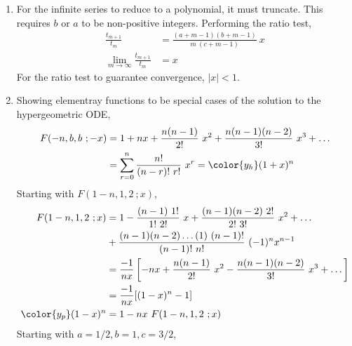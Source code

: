 \begin{enumerate}
\begin{enumerate}
              \item For the infinite series to reduce to a polynomial, it must truncate.
                    This requires $ b $ or $ a $ to be non-positive integers.
                    Performing the ratio test,
                    \begin{align}
                        \frac{t_{m+1}}{t_m}                             &
                        = \frac{(a+m-1)(b+m-1)}{m\ (c+m-1)}\ x                \\
                        \lim_{m \rightarrow \infty} \frac{t_{m+1}}{t_m} & = x
                    \end{align}
                    For the ratio test to guarantee convergence, $ |x| < 1 $.

              \item Showing elementray functions to be special cases of the solution
                    to the hypergeometric ODE,
                    \begin{align}
                        F(-n,b,b\ ;-x) & = 1 + nx + \frac{n(n-1)}{2!}\ x^2 +
                        \frac{n(n-1)(n-2)}{3!}\ x^3 + \dots                          \\
                                       & = \sum_{r=0}^{n} \frac{n!}{(n-r)!\ r!}\ x^r
                        = \color{y_h} (1+x)^n
                    \end{align}
                    Starting with $ F(1-n,1,2\ ; x) $,
                    \begin{align}
                        F(1-n,1,2\ ;x)        & = 1 - \frac{(n-1)\ 1!}{1!\ 2!}\ x
                        + \frac{(n-1)(n-2)\ 2!}{2!\ 3!}\ x^2 + \dots                \\
                                              & + \frac{(n-1)(n-2)\dots(1)\ (n-1)!}
                        {(n-1)!\ n!}\ (-1)^n x^{n-1}                                \\
                                              & = \frac{-1}{nx} \left[ -nx
                            + \frac{n(n-1)}{2!}\ x^2
                        - \frac{n(n-1)(n-2)}{3!}\ x^3 + \dots \right]               \\
                                              & = \frac{-1}{nx} [ (1-x)^n - 1 ]     \\
                        {\color{y_p} (1-x)^n} & = 1 - nx\ F(1-n,1,2\ ;x)
                    \end{align}
                    Starting with $ a = 1/2, b = 1, c = 3/2 $,
                    \begin{align}

\end{align}
\end{enumerate}
\end{enumerate}
